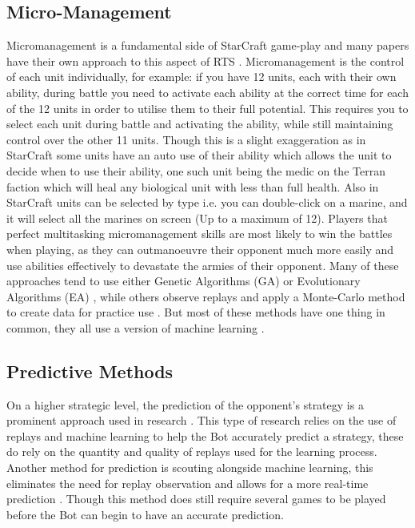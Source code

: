 \documentclass[journal]{IEEEtran}
\begin{document}
	\subsection{Micro-Management}
	Micromanagement is a fundamental side of StarCraft game-play and many papers have their own approach to this aspect of RTS \cite{SOMA,EffectiveMicro,Swarm,MM,SpecialTactics,UnitsControl}. Micromanagement is the control of each unit individually, for example: if you have 12 units, each with their own ability, during battle you need to activate each ability at the correct time for each of the 12 units in order to utilise them to their full potential. This requires you to select each unit during battle and activating the ability, while still maintaining control over the other 11 units. Though this is a slight exaggeration as in StarCraft some units have an auto use of their ability which allows the unit to decide when to use their ability, one such unit being the medic on the Terran faction which will heal any biological unit with less than full health. Also in StarCraft units can be selected by type i.e. you can double-click on a marine, and it will select all the marines on screen (Up to a maximum of 12). Players that perfect multitasking micromanagement skills are most likely to win the battles when playing, as they can outmanoeuvre their opponent much more easily and use abilities effectively to devastate the armies of their opponent. Many of these approaches tend to use either Genetic Algorithms (GA) or Evolutionary Algorithms (EA) \cite{SOMA, EffectiveMicro, Swarm}, while others observe replays and apply a Monte-Carlo method to create data for practice use \cite{MM}. But most of these methods have one thing in common, they all use a version of machine learning \cite{Survey}.
	
	\subsection{Predictive Methods}
	On a higher strategic level, the prediction of the opponent's strategy is a prominent approach used in research \cite{DataMine, Bayesian, Scouting, ReplayPred}. This type of research relies on the use of replays and machine learning to help the Bot accurately predict a strategy, these do rely on the quantity and quality of replays used for the learning process\cite{DataMine,Bayesian,ReplayPred}. Another method for prediction is scouting alongside machine learning, this eliminates the need for replay observation and allows for a more real-time prediction \cite{Scouting}. Though this method does still require several games to be played before the Bot can begin to have an accurate prediction.
	
\end{document}
